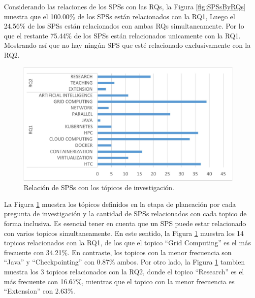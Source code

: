 Considerando las relaciones de los SPSs con las RQs, la Figura \ref{fig:SPSsByRQs} muestra que el 100.00\% de los SPSs están relacionados con la RQ1, Luego el 24.56\% de los SPSs están relacionados con ambas RQs simultaneamente. Por lo que el restante 75.44\% de los SPSs están relacionados unicamente con la RQ1. Mostrando así que no hay ningún SPS que esté relacionado exclusivamente con la RQ2.

\begin{figure}[htbp]
	\centering
	\vspace{10pt}
	\includegraphics[scale=0.7]{resources/figures/SPSsByTopic.jpg}
	\vspace{6pt}
	\caption{Relación de SPSs con los tópicos de investigación.}
	\label{fig:SPSsByTopics}
\end{figure}

La Figura \ref{fig:SPSsByTopics} muestra los tópicos definidos en la etapa de planeación por cada pregunta de investigación y la cantidad de SPSs relacionados con cada topico de forma inclusiva. Es esencial tener en cuenta que un SPS puede estar relacionado con varios topicos simultaneamente. En este sentido, la Figura \ref{fig:SPSsByTopics} muestra los 14 topicos relacionados con la RQ1, de los que el topico ``Grid Computing'' es el más frecuente con 34.21\%. En contraste, los topicos con la menor frecuencia son ``Java'' y ``Checkpointing'' con 0.87\% ambos. Por otro lado, la Figura \ref{fig:SPSsByTopics} tambien muestra los 3 topicos relacionados con la RQ2, donde el topico ``Research'' es el más frecuente con 16.67\%, mientras que el topico con la menor frecuencia es ``Extension'' con 2.63\%.

